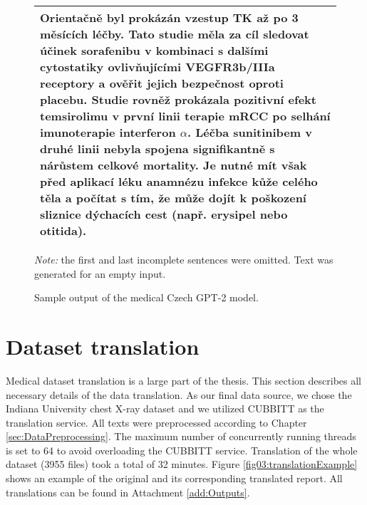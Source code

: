 \begin{figure}[htb]
\begin{tabular}{|l|}
{Orientačně byl prokázán vzestup TK až po 3 měsících léčby.\newline
Tato studie měla za cíl sledovat účinek sorafenibu v kombinaci s dalšími cytostatiky ovlivňujícími VEGFR3b/IIIa receptory a ověřit jejich bezpečnost oproti placebu. Studie rovněž prokázala pozitivní efekt temsirolimu v první linii terapie mRCC po selhání imunoterapie interferon $\alpha$. Léčba sunitinibem v druhé linii nebyla spojena signifikantně s nárůstem celkové mortality.\newline
Je nutné mít však před aplikací léku anamnézu infekce kůže celého těla a počítat s tím, že může dojít k poškození sliznice dýchacích cest (např. erysipel nebo otitida).\vspace{0.25em}}
\\ \hline
             \end{tabular}
        \caption{Sample output of the medical Czech GPT-2 model.}
	\label{fig02:gpt2MedExample}
\textit{Note:} the first and last incomplete sentences were omitted. Text was generated for an empty input.
\end{figure}

\section{Dataset translation}
Medical dataset translation is a large part of the thesis. This section describes all necessary details of the data translation. As our final data source, we chose the Indiana University chest X-ray dataset and we utilized CUBBITT as the translation service. All texts were preprocessed according to Chapter \ref{sec:DataPreprocessing}. The maximum number of concurrently running threads is set to 64 to avoid overloading the CUBBITT service. Translation of the whole dataset (3955 files) took a total of 32 minutes. Figure \ref{fig03:translationExample} shows an example of the original and its corresponding translated report. All translations can be found in Attachment \ref{add:Outputs}.

